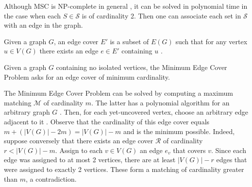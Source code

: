 Although MSC is NP-complete in general \cite{Karp1972}, it can be solved in polynomial time in the case when each $S\in \mathcal{S}$ is of cardinality 2. Then one can associate each set in $\mathcal{S}$ with an edge in the graph. 
\begin{definition}
Given a graph $G$, an edge cover $E'$ is a subset of $E(G)$ such that for any vertex $u \in V(G)$ there exists an edge $e \in E'$ containing $u$ \cite{Garey90}.
\end{definition}
\begin{definition}\label{mecp}
Given a graph $G$ containing no isolated vertices, the Minimum Edge Cover Problem asks for an edge cover of minimum cardinality.
\end{definition}
The Minimum Edge Cover Problem can be solved by computing a maximum matching $\mathcal{M}$ of cardinality $m$. The latter has a polynomial algorithm for an arbitrary graph $G$ \cite{edmonds_1965}. Then, for each yet-uncovered vertex, choose an arbitrary edge adjacent to it \cite{VANROOIJ20112147}. Observe that the cardinality of this edge cover equals $m + (|V(G)| - 2m) = |V(G)| - m$ and is the minimum possible. Indeed, suppose conversely that there exists an edge cover $\mathcal{R}$ of cardinality $r < |V(G)| - m$. Assign to each $v \in V(G)$ an edge $e_v$ that covers $v$. Since each edge was assigned to at most 2 vertices, there are at least $|V(G)| - r$ edges that were assigned to exactly 2 vertices. These form a matching of cardinality greater than $m$, a contradiction.

